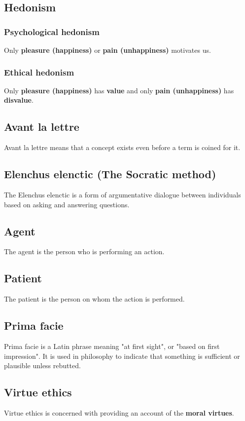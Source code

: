 \documentclass[11pt]{article}
\begin{document}
\subsection{Hedonism}
\label{sec:orgc0a72da}

\subsubsection{Psychological hedonism}
\label{sec:orge3a0055}
Only \textbf{pleasure (happiness)} or \textbf{pain (unhappiness)} motivates us.
\subsubsection{Ethical hedonism}
\label{sec:org697e7a3}
Only \textbf{pleasure (happiness)} has \textbf{value} and only \textbf{pain (unhappiness)} has \textbf{disvalue}.
\subsection{Avant la lettre}
\label{sec:org682bb16}
Avant la lettre means that a concept exists even before a term is coined for it.
\subsection{Elenchus elenctic (The Socratic method)}
\label{sec:orgab6eeb5}
The Elenchus elenctic is a form of argumentative dialogue between individuals based on asking and answering questions.
\subsection{Agent}
\label{sec:org32dcf44}
The agent is the person who is performing an action.
\subsection{Patient}
\label{sec:org6e8e2d1}
The patient is the person on whom the action is performed.
\subsection{Prima facie}
\label{sec:org614f8df}
Prima facie is a Latin phrase meaning "at first sight", or "based on first impression". It is used in philosophy to indicate that something is sufficient or plausible unless rebutted.
\subsection{Virtue ethics}
\label{sec:org7f0fcef}
Virtue ethics is concerned with providing an account of the \textbf{moral virtues}.
\end{document}
